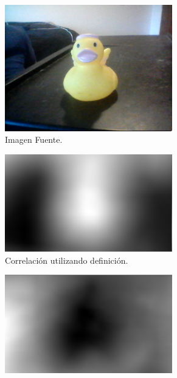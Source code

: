 \begin{figure}[H]
\centering
	\begin{subfigure}{.4\textwidth}
		\centering
		\includegraphics[width=0.8\textwidth]{Imagenes/Original.png}
		\caption{Imagen Fuente.}
		\label{fig:original}
	\end{subfigure}
	\begin{subfigure}{.4\textwidth}
		\centering
		\includegraphics[width=0.8\textwidth]{Imagenes/Correlation.png}
		\caption{Correlación utilizando definición.}
		\label{fig:corr}
	\end{subfigure}
		\begin{subfigure}{.4\textwidth}
		\centering
		\includegraphics[width=0.8\textwidth]{Imagenes/SQDIFF.png}

\end{subfigure}
\end{figure}
